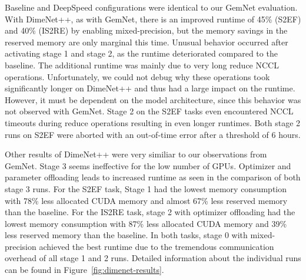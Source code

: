 Baseline and DeepSpeed configurations were identical to our GemNet evaluation. 
With DimeNet++, as with GemNet, there is an improved runtime of 45\% (S2EF) and 40\% (IS2RE) by enabling 
mixed-precision, but the memory savings in the reserved memory are only marginal 
this time. Unusual behavior occurred after activating stage 1 and stage 2, as 
the runtime deteriorated compared to the baseline. The additional runtime was 
mainly due to very long reduce NCCL operations. Unfortunately, we could 
not debug why these operations took significantly longer on DimeNet++ and 
thus had a large impact on the runtime. However, it must be dependent on 
the model architecture, since this behavior was not observed with GemNet.
Stage 2 on the S2EF tasks even encountered NCCL timeouts during reduce operations 
resulting in even longer runtimes. Both stage 2 runs on S2EF were aborted with an 
out-of-time error after a threshold of 6 hours.

Other results of DimeNet++ were very similiar to our observations from GemNet. 
Stage 3 seems ineffective for the low number of GPUs. Optimizer and parameter offloading 
leads to increased runtime as seen in the comparison of both stage 3 runs. For the S2EF 
task, Stage 1 had the lowest memory consumption with 78\% less allocated CUDA memory and 
almost 67\% less reserved memory than the baseline. For the IS2RE task, stage 2 with 
optimizer offloading had the lowest memory consumption with 87\% less allocated CUDA 
memory and 39\% less reserved memory than the baseline. In both tasks, stage 0 with 
mixed-precision achieved the best runtime due to the tremendous communication overhead 
of all stage 1 and 2 runs. Detailed information about the individual runs can be found
in Figure~\ref{fig:dimenet-results}.

